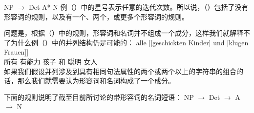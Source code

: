 \ea 
NP $\to$ Det A* N
\z
例（）中的星号\isc{*}\is{*}表示任意的迭代次数。所以说，（）包括了没有形容词的规则，以及有一个、两个，或更多个形容词的规则。

问题是，根据（）中的规则，形容词和名词并不组成一个成分，这样我们就解释不了为什么例（）中的并列结构仍是可能的：
\ea
\gll alle [[geschickten Kinder] und [klugen Frauen]]\\
	 所有  \spacebr{}\spacebr{}有能力 孩子 和  \spacebr{}聪明 女人\\
\z
如果我们假设并列涉及到具有相同句法属性的两个或两个以上的字符串的组合的话，那么我们就需要认为形容词和名词构成了一个成分。

%
下面的规则说明了截至目前所讨论的带形容词的名词短语：
\eal
\label{NP-Regeln}
\ex NP $\to$ Det \nbar
\ex\label{NP-Regeln-Adj} \nbar $\to$ A \nbar
\ex\label{NP-Regeln-Nbar-N} \nbar $\to$ N
\zl

